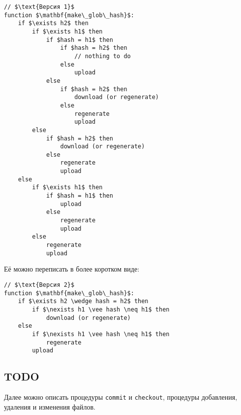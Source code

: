 \begin{lstlisting}
// $\text{Версия 1}$
function $\mathbf{make\_glob\_hash}$:
	if $\exists h2$ then
		if $\exists h1$ then
			if $hash = h1$ then
				if $hash = h2$ then
					// nothing to do
				else
					upload
			else
				if $hash = h2$ then
					download (or regenerate)
				else
					regenerate
					upload
		else
			if $hash = h2$ then
				download (or regenerate)
			else
				regenerate
				upload
	else
		if $\exists h1$ then
			if $hash = h1$ then
				upload
			else
				regenerate
				upload
		else
			regenerate
			upload
\end{lstlisting}

Её можно переписать в более коротком виде:
\begin{lstlisting}
// $\text{Версия 2}$
function $\mathbf{make\_glob\_hash}$:
	if $\exists h2 \wedge hash = h2$ then
		if $\nexists h1 \vee hash \neq h1$ then
			download (or regenerate)
	else
		if $\nexists h1 \vee hash \neq h1$ then
			regenerate
		upload
\end{lstlisting}

\subsection{TODO}
Далее можно описать процедуры \texttt{commit} и \texttt{checkout}, процедуры добавления, удаления и изменения файлов.